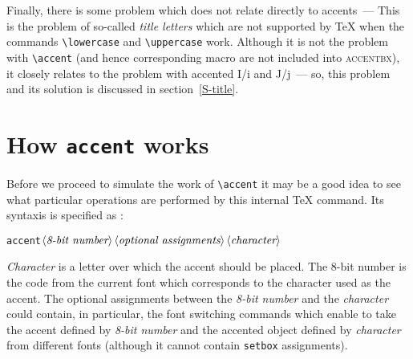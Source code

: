 Finally, there is some problem which does not relate directly
to accents~--- This is the problem of so-called \textit{title letters}
which are not supported by \TeX{} when
the commands \verb?\lowercase? and \verb?\uppercase? work.
Although it is not the problem with \verb?\accent?
(and hence corresponding macro are not included into \textsc{accentbx}),
it closely relates to the problem with accented I/i and J/j~--- so,
this problem and its solution is discussed in section~\ref{S-title}.

\section{How {\tt\bs{}accent} works\label{S-accent}}

Before we proceed to simulate the work of \verb?\accent? it may be a good
idea to see what particular operations are performed by this internal
\TeX{} command. Its syntaxis is specified as \cite{TEXB,TOPIC}:
\begin{center}
{\tt\bs{}accent}$\left<\hbox{\em 8-bit number}\right>
                \left<\hbox{\em optional assignments}\right>
                \left<\hbox{\em character}\right>$%
\end{center}
{\em Character} is a letter over which the accent should be placed.
The 8-bit number is the code from the current font which corresponds
to the character used as the accent.
The optional assignments between the {\em 8-bit number} and
the {\em character} could contain, in particular, the font switching
commands which enable to take the accent defined by
{\em 8-bit number} and the accented object defined by {\em character}
from different fonts
(although it cannot contain {\tt\bs{}setbox} assignments).

